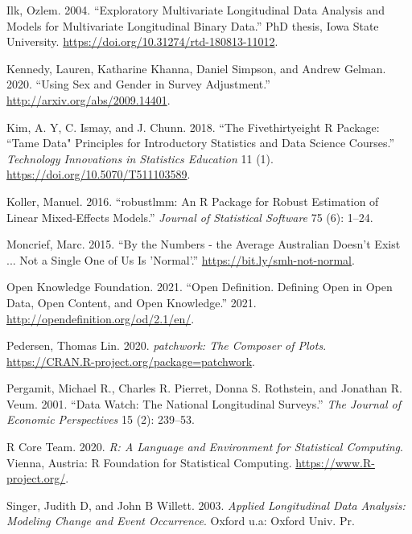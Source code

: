 \documentclass{article}
\begin{document}
\leavevmode\hypertarget{ref-ilk2004}{}%
Ilk, Ozlem. 2004. ``Exploratory Multivariate Longitudinal Data Analysis and Models for Multivariate Longitudinal Binary Data.'' PhD thesis, Iowa State University. \url{https://doi.org/10.31274/rtd-180813-11012}.

\leavevmode\hypertarget{ref-kennedy2020using}{}%
Kennedy, Lauren, Katharine Khanna, Daniel Simpson, and Andrew Gelman. 2020. ``Using Sex and Gender in Survey Adjustment.'' \url{http://arxiv.org/abs/2009.14401}.

\leavevmode\hypertarget{ref-tamedata}{}%
Kim, A. Y, C. Ismay, and J. Chunn. 2018. ``The Fivethirtyeight R Package: ``Tame Data" Principles for Introductory Statistics and Data Science Courses.'' \emph{Technology Innovations in Statistics Education} 11 (1). \url{https://doi.org/10.5070/T511103589}.

\leavevmode\hypertarget{ref-KollerManuel2016rARP}{}%
Koller, Manuel. 2016. ``robustlmm: An R Package for Robust Estimation of Linear Mixed-Effects Models.'' \emph{Journal of Statistical Software} 75 (6): 1--24.

\leavevmode\hypertarget{ref-notaverage}{}%
Moncrief, Marc. 2015. ``By the Numbers - the Average Australian Doesn't Exist ... Not a Single One of Us Is 'Normal'.'' \url{https://bit.ly/smh-not-normal}.

\leavevmode\hypertarget{ref-opendata}{}%
Open Knowledge Foundation. 2021. ``Open Definition. Defining Open in Open Data, Open Content, and Open Knowledge.'' 2021. \url{http://opendefinition.org/od/2.1/en/}.

\leavevmode\hypertarget{ref-patchwork}{}%
Pedersen, Thomas Lin. 2020. \emph{patchwork: The Composer of Plots}. \url{https://CRAN.R-project.org/package=patchwork}.

\leavevmode\hypertarget{ref-MichaelRPergamit2001DWTN}{}%
Pergamit, Michael R., Charles R. Pierret, Donna S. Rothstein, and Jonathan R. Veum. 2001. ``Data Watch: The National Longitudinal Surveys.'' \emph{The Journal of Economic Perspectives} 15 (2): 239--53.

\leavevmode\hypertarget{ref-R}{}%
R Core Team. 2020. \emph{R: A Language and Environment for Statistical Computing}. Vienna, Austria: R Foundation for Statistical Computing. \url{https://www.R-project.org/}.

\leavevmode\hypertarget{ref-SingerJudithD2003Alda}{}%
Singer, Judith D, and John B Willett. 2003. \emph{Applied Longitudinal Data Analysis: Modeling Change and Event Occurrence}. Oxford u.a: Oxford Univ. Pr.
\end{document}
